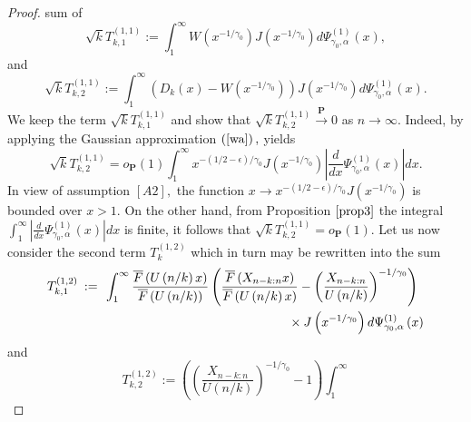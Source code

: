 \documentclass[12pt,reqno,openbib,runningheads,a4paper,portrait]{amsart}%
\begin{document}
\begin{proof}
sum of
\begin{equation}
\sqrt{k}T_{k,1}^{\left(  1,1\right)  }:=\int_{1}^{\infty}W\left(
x^{-1/\gamma_{0}}\right)  J\left(  x^{-1/\gamma_{0}}\right)  d\Psi_{\gamma
_{0},\alpha}^{\left(  1\right)  }\left(  x\right)  , \label{w-approxi-1}%
\end{equation}
and
\[
\sqrt{k}T_{k,2}^{\left(  1,1\right)  }:=\int_{1}^{\infty}\left(  D_{k}\left(
x\right)  -W\left(  x^{-1/\gamma_{0}}\right)  \right)  J\left(  x^{-1/\gamma
_{0}}\right)  d\Psi_{\gamma_{0},\alpha}^{\left(  1\right)  }\left(  x\right)
.
\]
We keep the term $\sqrt{k}T_{k,1}^{\left(  1,1\right)  }$ and show that
$\sqrt{k}T_{k,2}^{\left(  1,1\right)  }\overset{\mathbf{P}}{\rightarrow}0$ as
$n\rightarrow\infty.$ Indeed, by applying the Gaussian approximation $\left(
\ref{wa}\right)  ,$ yields%
\[
\sqrt{k}T_{k,2}^{\left(  1,1\right)  }=o_{\mathbf{P}}\left(  1\right)
\int_{1}^{\infty}x^{-\left(  1/2-\epsilon\right)  /\gamma_{0}}J\left(
x^{-1/\gamma_{0}}\right)  \left\vert \frac{d}{dx}\Psi_{\gamma_{0},\alpha
}^{\left(  1\right)  }\left(  x\right)  \right\vert dx.
\]
In view of assumption $\left[  A2\right]  ,$ the function $x\rightarrow
x^{-\left(  1/2-\epsilon\right)  /\gamma_{0}}J\left(  x^{-1/\gamma_{0}%
}\right)  $ is bounded over $x>1.$ On the other hand, from Proposition
$\ref{prop3}$ the integral $\int_{1}^{\infty}\left\vert \frac{d}{dx}%
\Psi_{\gamma_{0},\alpha}^{\left(  1\right)  }\left(  x\right)  \right\vert dx$
is finite, it follows that $\sqrt{k}T_{k,2}^{\left(  1,1\right)
}=o_{\mathbf{P}}\left(  1\right)  .$ Let us now consider the second term
$T_{k}^{\left(  1,2\right)  }$ which in turn may be rewritten into the sum
\begin{align*}
&  T_{k,1}^{\left(  1,2\right)  }%
\begin{array}
[c]{c}%
:=
\end{array}
\int_{1}^{\infty}\frac{\overline{F}\left(  U\left(  n/k\right)  x\right)
}{\overline{F}\left(  U\left(  n/k\right)  \right)  }\left(  \frac
{\overline{F}\left(  X_{n-k:n}x\right)  }{\overline{F}\left(  U\left(
n/k\right)  x\right)  }-\left(  \frac{X_{n-k:n}}{U\left(  n/k\right)
}\right)  ^{-1/\gamma_{0}}\right) \\
&
\ \ \ \ \ \ \ \ \ \ \ \ \ \ \ \ \ \ \ \ \ \ \ \ \ \ \ \ \ \ \ \ \ \ \ \ \ \ \ \ \ \ \ \ \ \ \ \ \ \ \ \ \ \ \ \ \ \times
J\left(  x^{-1/\gamma_{0}}\right)  d\Psi_{\gamma_{0},\alpha}^{\left(
1\right)  }\left(  x\right)
\end{align*}
and%
\[
T_{k,2}^{\left(  1,2\right)  }:=\left(  \left(  \frac{X_{n-k:n}}{U\left(
n/k\right)  }\right)  ^{-1/\gamma_{0}}-1\right)  \int_{1}^{\infty}%
\]
\end{proof}
\end{document}
